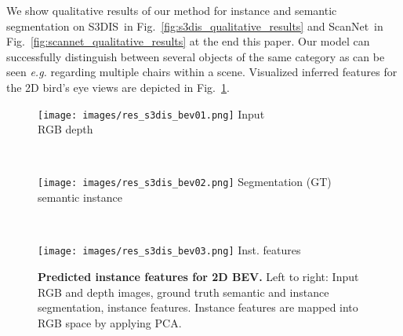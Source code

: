 \documentclass[runningheads]{llncs}
\newcommand{\reffig}[1]{Fig.~\ref{fig:#1}}
\newcommand{\eg}{\textit{e.g. }}
\newcommand{\rulesep}{\unskip\ \vrule\ }
\begin{document}
{We show qualitative results of our method for instance and semantic segmentation on S3DIS\,\cite{Armeni16CVPR} in \reffig{s3dis_qualitative_results} and ScanNet\,\cite{Dai17CVPR} in \reffig{scannet_qualitative_results} at the end this paper. Our model can successfully distinguish between several objects of the same category as can be seen \eg regarding multiple chairs within a scene. Visualized inferred features for the 2D bird's eye views are depicted in \reffig{s3dis_2d}.

\begin{figure}
\centering
\begin{minipage}[t]{.37\linewidth}
\centering
\texttt{[image: images/res\_s3dis\_bev01.png]}
Input \\
RGB \hspace{11mm} depth
\end{minipage}
    \rulesep
\begin{minipage}[t]{.37\linewidth}
\centering
\texttt{[image: images/res\_s3dis\_bev02.png]}
Segmentation (GT) \\
semantic \hspace{7mm}  instance
\end{minipage}
    \rulesep
\begin{minipage}[t]{.2\linewidth}
\centering
\texttt{[image: images/res\_s3dis\_bev03.png]}
Inst. features
\end{minipage}
    \caption{\textbf{Predicted instance features for 2D BEV.} Left to right: Input RGB and depth images, ground truth semantic and instance segmentation, instance features. Instance features are mapped into RGB space by applying PCA.}
      \label{fig:s3dis_2d}
\end{figure}

}
\end{document}
